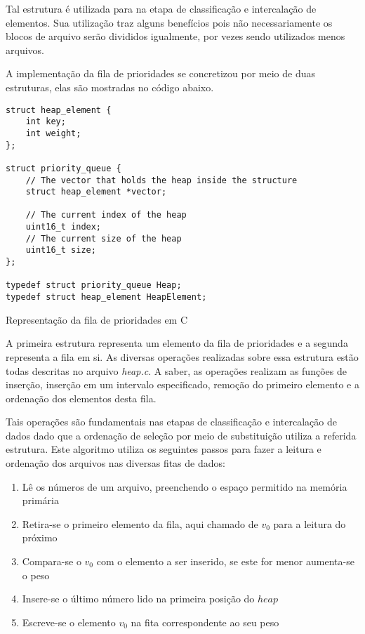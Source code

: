 \documentclass[a4paper, 12pt]{report}
\begin{document}
Tal estrutura é utilizada para na etapa de classificação e intercalação de
elementos. Sua utilização traz alguns benefícios pois não necessariamente os
blocos de arquivo serão divididos igualmente, por vezes sendo utilizados menos
arquivos.

A implementação da fila de prioridades se concretizou por meio de duas
estruturas, elas são mostradas no código abaixo.

\begin{listing}[H]
\begin{verbatim}
struct heap_element {
    int key;
    int weight;
};

struct priority_queue {
    // The vector that holds the heap inside the structure
    struct heap_element *vector;

    // The current index of the heap
    uint16_t index;
    // The current size of the heap
    uint16_t size;
};

typedef struct priority_queue Heap;
typedef struct heap_element HeapElement;
\end{verbatim}
\caption{Representação da fila de prioridades em C}
\end{listing}

A primeira estrutura representa um elemento da fila de prioridades e a segunda
representa a fila em si. As diversas operações realizadas sobre essa estrutura
estão todas descritas no arquivo \emph{heap.c}. A saber, as operações realizam
as funções de inserção, inserção em um intervalo especificado, remoção do
primeiro elemento e a ordenação dos elementos desta fila.

Tais operações são fundamentais nas etapas de classificação e intercalação de
dados dado que a ordenação de seleção por meio de substituição utiliza a
referida estrutura. Este algoritmo utiliza os seguintes passos para fazer
a leitura e ordenação dos arquivos nas diversas fitas de dados:

\begin{enumerate}
\item Lê os números de um arquivo, preenchendo o espaço permitido na memória primária
\item Retira-se o primeiro elemento da fila, aqui chamado de $v_0$ para a leitura do próximo
\item Compara-se o $v_0$ com o elemento a ser inserido, se este for menor aumenta-se o peso
\item Insere-se o último número lido na primeira posição do $heap$
\item Escreve-se o elemento $v_0$ na fita correspondente ao seu peso
\end{enumerate}
\end{document}
